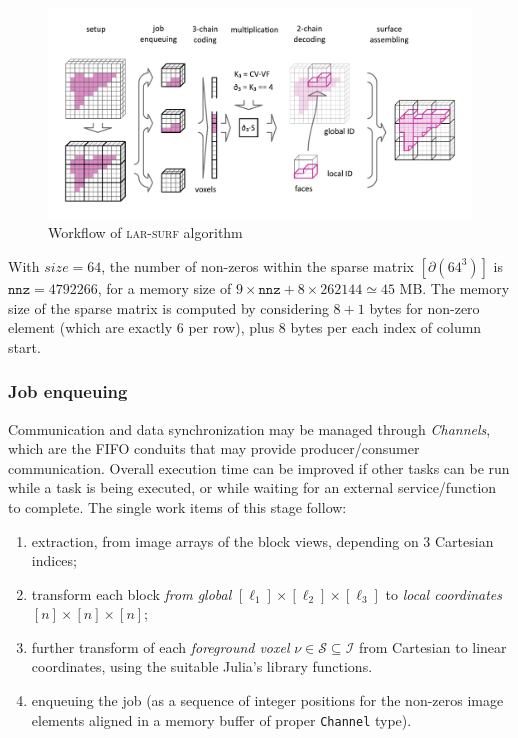 \begin{figure}[tbp]
\includegraphics[width=\textwidth]{figs/schema_horizontal.pdf} 
\caption{Workflow of \textsc{lar-surf} algorithm}
\label{fig:schema}
\end{figure}

With $size=64$, the number of non-zeros within the sparse matrix $[\partial(64^3)]$ is $\mathtt{nnz} = 4 792 266$, for a memory size of $9\times \mathtt{nnz}+8\times 262144 \simeq 45$ MB. The memory size of the sparse matrix is computed by considering $8+1$ bytes for non-zero element (which are exactly 6 per row), plus 8 bytes per each index of column start.  


\subsubsection*{Job enqueuing}
\label{sec:job-enq}
Communication and data synchronization may be managed through \emph{Channels}, which are the FIFO conduits that may provide producer/consumer communication. Overall execution time can be improved if other tasks can be run while a task is being executed, or while waiting for an external service/function to complete. The single work items of this stage follow:
\begin{enumerate}

\item extraction, from image arrays of the block views, depending on 3 Cartesian indices;

\item transform  each block \emph{from global} $[\ell_1]\times[\ell_2]\times[\ell_3]$ to \emph{local coordinates} $[n]\times[n]\times[n]$;

\item further transform of each \emph{foreground voxel} $\nu\in\mathcal{S}\subseteq\mathcal{I}$ from Cartesian to linear coordinates, using the suitable Julia's library functions.

\item enqueuing the job (as a sequence of integer positions for the non-zeros image elements aligned in a memory buffer of proper \texttt{Channel} type).
\end{enumerate}


